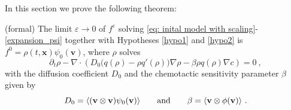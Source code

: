 \documentclass[review,onefignum,onetabnum]{siamart220329}
\begin{document}
In this section we prove the following theorem:
\begin{theorem}{}\label{theorem1}(formal)
The limit $\varepsilon \rightarrow 0$ of $f^\varepsilon$ solving \cref{eq: inital model with scaling}-\cref{expansion_psi} together with Hypotheses \cref{hypo1} and \cref{hypo2} is $f^0 = \rho(t,\mathbf{x})\psi_0(\mathbf{v})$, where $\rho$ solves
\begin{equation}
    \partial_t\rho-\nabla\cdot\left(D_0\big(q(\rho)-\rho q'(\rho) \big)\nabla \rho-\beta\rho q(\rho)\nabla c \right)=0\ ,\label{eq: macroscopic equation1}
\end{equation}
with the diffusion coefficient $D_0$ and the chemotactic sensitivity parameter $\beta$ given by
\begin{equation}D_0=\langle(\mathbf{v}\otimes \mathbf{v})\psi_0(\mathbf{v})\rangle\qquad \textnormal{and}\qquad \beta=\langle\mathbf{v}\otimes\phi(\mathbf{v})\rangle\ . \label{eq: macroscopic coefficients}
\end{equation}
\end{theorem}
\end{document}
